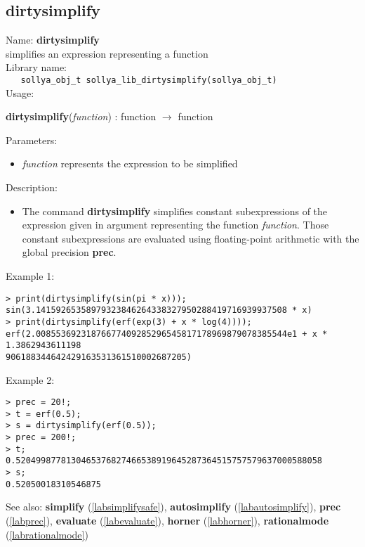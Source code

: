 \subsection{dirtysimplify}
\label{labdirtysimplify}
\noindent Name: \textbf{dirtysimplify}\\
\phantom{aaa}simplifies an expression representing a function\\[0.2cm]
\noindent Library name:\\
\verb|   sollya_obj_t sollya_lib_dirtysimplify(sollya_obj_t)|\\[0.2cm]
\noindent Usage: 
\begin{center}
\textbf{dirtysimplify}(\emph{function}) : \textsf{function} $\rightarrow$ \textsf{function}\\
\end{center}
Parameters: 
\begin{itemize}
\item \emph{function} represents the expression to be simplified
\end{itemize}
\noindent Description: \begin{itemize}

\item The command \textbf{dirtysimplify} simplifies constant subexpressions of the
   expression given in argument representing the function
   \emph{function}. Those constant subexpressions are evaluated using
   floating-point arithmetic with the global precision \textbf{prec}.
\end{itemize}
\noindent Example 1: 
\begin{center}\begin{minipage}{15cm}\begin{Verbatim}[frame=single]
> print(dirtysimplify(sin(pi * x)));
sin(3.14159265358979323846264338327950288419716939937508 * x)
> print(dirtysimplify(erf(exp(3) + x * log(4))));
erf(2.00855369231876677409285296545817178969879078385544e1 + x * 1.3862943611198
906188344642429163531361510002687205)
\end{Verbatim}
\end{minipage}\end{center}
\noindent Example 2: 
\begin{center}\begin{minipage}{15cm}\begin{Verbatim}[frame=single]
> prec = 20!;
> t = erf(0.5);
> s = dirtysimplify(erf(0.5));
> prec = 200!;
> t;
0.5204998778130465376827466538919645287364515757579637000588058
> s;
0.52050018310546875
\end{Verbatim}
\end{minipage}\end{center}
See also: \textbf{simplify} (\ref{labsimplifysafe}), \textbf{autosimplify} (\ref{labautosimplify}), \textbf{prec} (\ref{labprec}), \textbf{evaluate} (\ref{labevaluate}), \textbf{horner} (\ref{labhorner}), \textbf{rationalmode} (\ref{labrationalmode})
